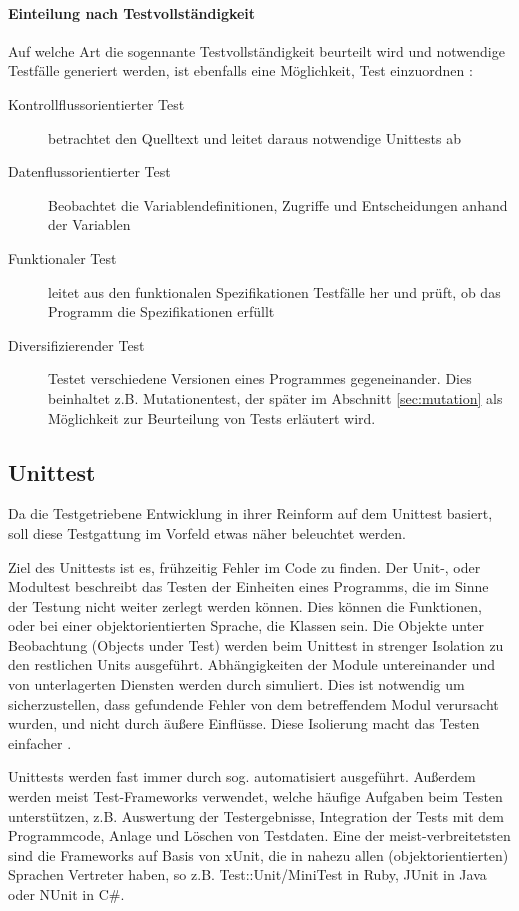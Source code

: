 \paragraph{Einteilung nach Testvollständigkeit} Auf welche Art die sogennante Testvollständigkeit beurteilt wird und notwendige Testfälle generiert werden, ist ebenfalls eine Möglichkeit, Test einzuordnen \citep{liggesmeyer_modultest_1990}:
\begin{description}
 \item[Kontrollflussorientierter Test] betrachtet den Quelltext und leitet daraus notwendige Unittests ab
 \item[Datenflussorientierter Test] Beobachtet die Variablendefinitionen, Zugriffe und Entscheidungen anhand der Variablen
 \item[Funktionaler Test] leitet aus den funktionalen Spezifikationen Testfälle her und prüft, ob das Programm die Spezifikationen erfüllt
 \item[Diversifizierender Test] Testet verschiedene Versionen eines Programmes gegeneinander. Dies beinhaltet z.B. Mutationentest, der später im Abschnitt \ref{sec:mutation} \textit{} als Möglichkeit zur Beurteilung von Tests erläutert wird.
\end{description}
\subsection{Unittest}
Da die Testgetriebene Entwicklung in ihrer Reinform auf dem Unittest basiert, soll diese Testgattung im Vorfeld etwas näher beleuchtet werden.

Ziel des Unittests ist es, frühzeitig Fehler im Code zu finden. Der Unit-, oder Modultest beschreibt das Testen der Einheiten eines Programms, die im Sinne der Testung nicht weiter zerlegt werden können. Dies können die Funktionen, oder bei einer objektorientierten Sprache, die Klassen sein. Die Objekte unter Beobachtung (Objects under Test) werden beim Unittest in strenger Isolation zu den restlichen Units ausgeführt. Abhängigkeiten der Module untereinander und von unterlagerten Diensten werden durch  simuliert. Dies ist notwendig um sicherzustellen, dass gefundende Fehler von dem betreffendem Modul verursacht wurden, und nicht durch äußere Einflüsse. Diese Isolierung macht das Testen einfacher \citep{goodliffe_code_2006}.



Unittests werden fast immer durch sog.  automatisiert ausgeführt. Außerdem werden meist Test-Frameworks verwendet, welche häufige Aufgaben beim Testen unterstützen, z.B. Auswertung der Testergebnisse, Integration der Tests mit dem Programmcode, Anlage und Löschen von Testdaten.  Eine der meist-verbreitetsten sind die Frameworks auf Basis von xUnit, die in nahezu allen (objektorientierten) Sprachen Vertreter haben, so z.B. Test::Unit/MiniTest in Ruby, JUnit in Java oder NUnit in C\#.

